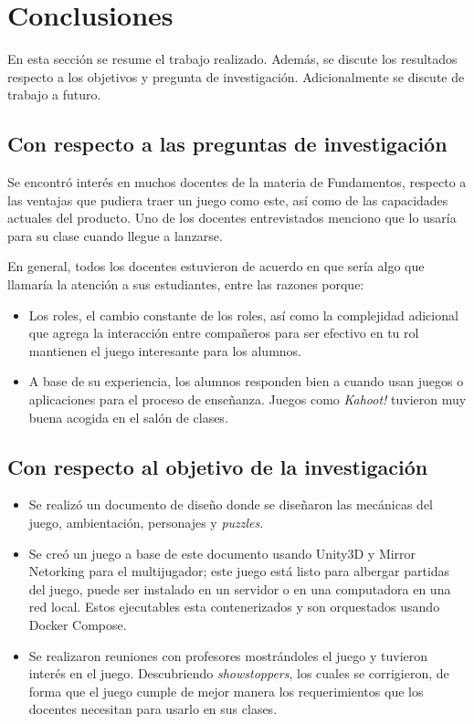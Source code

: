 \chapter{Conclusiones}\label{conclusiones}
 
 En esta sección se resume el trabajo realizado. Además, se discute los resultados respecto a los objetivos y pregunta de investigación. Adicionalmente se discute de trabajo a futuro.
 
\section{Con respecto a las preguntas de investigación}

Se encontró interés en muchos docentes de la materia de Fundamentos, respecto a las ventajas que pudiera traer un juego como este, así como de las capacidades actuales del producto. Uno de los docentes entrevistados menciono que lo usaría para su clase cuando llegue a lanzarse. 

En general, todos los docentes estuvieron de acuerdo en que sería algo que llamaría la atención a sus estudiantes, entre las razones porque:
\begin{itemize}
    \item Los roles, el cambio constante de los roles, así como la complejidad adicional que agrega la interacción entre compañeros para ser efectivo en tu rol mantienen el juego interesante para los alumnos.
    \item A base de su experiencia, los alumnos responden bien a cuando usan juegos o aplicaciones para el proceso de enseñanza. Juegos como \textit{Kahoot!} tuvieron muy buena acogida  en el salón de clases.
\end{itemize}

\section{Con respecto al objetivo de la investigación}
\begin{itemize}
    \item Se realizó un documento de diseño donde se diseñaron las mecánicas del juego, ambientación, personajes y \textit{puzzles}.
    \item Se creó un juego a base de este documento usando Unity3D y Mirror Netorking para el multijugador; este juego está listo para albergar partidas del juego, puede ser instalado en un servidor o en una computadora en una red local. Estos ejecutables esta contenerizados y son orquestados usando Docker Compose.
    \item Se realizaron reuniones con profesores mostrándoles el juego y tuvieron interés en el juego. Descubriendo \textit{showstoppers}, los cuales se corrigieron, de forma que el juego cumple de mejor manera los requerimientos que los docentes necesitan para usarlo en sus clases.
\end{itemize}

